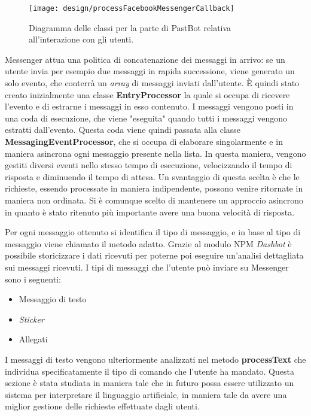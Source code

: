 \begin{figure}[H]
  \centering
  \texttt{[image: design/processFacebookMessengerCallback]}
  \caption{Diagramma delle classi per la parte di PastBot relativa
all'interazione con gli utenti.}
\end{figure}

Messenger attua una politica di concatenazione dei messaggi in arrivo: se un
utente invia per esempio due messaggi in rapida successione, viene generato un
solo evento, che conterrà un \textit{array} di messaggi inviati dall'utente. È
quindi stato creato inizialmente una classe \textbf{EntryProcessor} la quale si
occupa di ricevere l'evento e di estrarne i messaggi in esso contenuto. I
messaggi vengono posti in una coda di esecuzione, che viene "eseguita" quando
tutti i messaggi vengono estratti dall'evento.
Questa coda viene quindi passata alla classe \textbf{MessagingEventProcessor},
che si occupa di elaborare singolarmente e in maniera asincrona ogni messaggio
presente nella lista. In questa maniera, vengono gestiti diversi eventi nello
stesso tempo di esecuzione, velocizzando il tempo di risposta e diminuendo il
tempo di attesa. Un svantaggio di questa scelta è che le richieste,
essendo processate in maniera indipendente, possono venire ritornate in maniera
non ordinata. Si è comunque scelto di mantenere un approccio asincrono in
quanto è stato ritenuto più importante avere una buona velocità di risposta.

Per ogni messaggio ottenuto si identifica il tipo di messaggio, e in base al
tipo di messaggio viene chiamato il metodo adatto. Grazie al modulo NPM
\textit{Dashbot} è possibile storicizzare i dati ricevuti per poterne poi
eseguire un'analisi dettagliata sui messaggi ricevuti.
I tipi di messaggi che l'utente può inviare su Messenger sono i seguenti:
\begin{itemize}
  \item Messaggio di testo
  \item \textit{Sticker}
  \item Allegati
\end{itemize}
I messaggi di testo vengono ulteriormente analizzati nel metodo
\textbf{processText} che individua specificatamente il tipo di comando che
l'utente ha mandato. Questa sezione è stata studiata in maniera tale che in
futuro possa essere utilizzato un sistema per interpretare il linguaggio
artificiale, in maniera tale da avere una miglior gestione delle richieste
effettuate dagli utenti.

